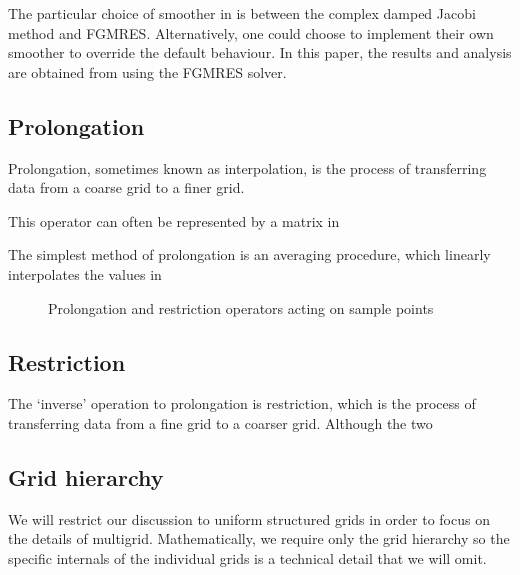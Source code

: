The particular choice of smoother in \oomph is between the complex damped Jacobi method and FGMRES.
Alternatively, one could choose to implement their own smoother to override the default behaviour.
In this paper, the results and analysis are obtained from using the FGMRES solver.



\subsection{Prolongation}

Prolongation, sometimes known as interpolation, is the process of transferring data from a coarse grid to a finer grid.

This operator can often be represented by a matrix in 

The simplest method of prolongation is an averaging procedure, which linearly interpolates the values in





\begin{figure}
	\caption{Prolongation and restriction operators acting on sample points}
\end{figure}



\subsection{Restriction}

The `inverse' operation to prolongation is restriction, which is the process of transferring data from a fine grid to a coarser grid.
Although the two 









\subsection{Grid hierarchy}

We will restrict our discussion to uniform structured grids in order to focus on the details of multigrid.
Mathematically, we require only the grid hierarchy so the specific internals of the individual grids is a technical detail that we will omit. 

